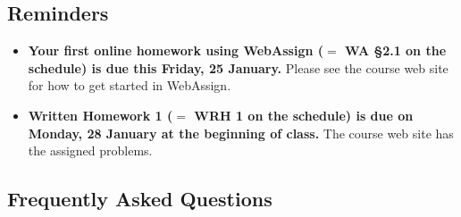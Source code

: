 \documentclass[12pt]{article}
\begin{document}
\renewcommand{\d}{\displaystyle}

\subsection*{Reminders}
\begin{itemize}
\item \textbf{Your first online homework using WebAssign ($=$ WA \S2.1 on the schedule) is due this Friday, 25 January.}  Please see the course web site for how to get started in WebAssign.
\item \textbf{Written Homework 1 ($=$ WRH 1 on the schedule) is due on Monday, 28 January at the beginning of class.}  The course web site has the assigned problems.
\end{itemize}

\subsection*{Frequently Asked Questions}
\end{document}
